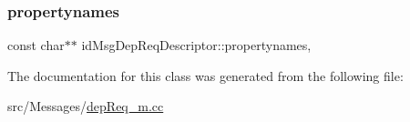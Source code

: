 \subsubsection{\texorpdfstring{propertynames}{propertynames}}
{\footnotesize\ttfamily const char$\ast$$\ast$ id\+Msg\+Dep\+Req\+Descriptor\+::propertynames\hspace{0.3cm}{\ttfamily [mutable]}, {\ttfamily [private]}}



The documentation for this class was generated from the following file\+:\begin{DoxyCompactItemize}
\item 
src/\+Messages/\hyperlink{dep_req__m_8cc}{dep\+Req\+\_\+m.\+cc}\end{DoxyCompactItemize}
